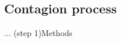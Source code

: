 \subsection{Contagion process}
\begin{frame}{... (step 1)}{Methods}
	\Itemize{
		\item 
		\item 
	}
\end{frame}

